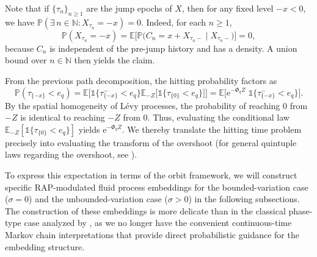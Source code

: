 \documentclass[a4paper,11pt]{article}
\numberwithin{equation}{section}
\theoremstyle{plain}
\theoremstyle{definition}
\newcommand{\1}{\mathbf{1}}
\newcommand{\e}{\mathrm{e}}
\newcommand{\PP}{\mathbb{P}}
\newcommand{\EE}{\mathbb{E}}
\begin{document}
Note that if $\{\tau_n\}_{n \ge 1}$ are the jump epochs of $X$, then for any fixed level $-x < 0$, we have $\mathbb{P}(\exists\, n\in \mathbb{N}: X_{\tau_n} = -x)=0$. Indeed, for each $n\geq 1$,
\[
\PP(X_{\tau_n}=-x)=\EE\Big[\PP\big(C_n=x+X_{\tau_n-}\mid X_{\tau_n-}\big)\Big]=0,
\]
because $C_n$ is independent of the pre-jump history and has a density. A union bound over $n\in\mathbb{N}$ then yields the claim.


From the previous path decomposition, the hitting probability factors as
\begin{equation}\label{eq:hitting_factor}
\PP(\tau_{\{-x\}} < e_q) = \mathbb{E}\Big[\mathds{1}\big\{\tau^-_{\{-x\}} < e_q\big\}\mathbb{E}_{-Z}\big[\mathds{1}\{\tau_{\{0\}} < e_q\}\big]\Big] = \mathbb{E}\Big[\e^{-\Phi_q Z}\;\mathds{1}\big\{\tau^-_{\{-x\}} < e_q\big\}\Big].
\end{equation}
By the spatial homogeneity of Lévy processes, the probability of reaching $0$ from $-Z$ is identical to reaching $-Z$ from $0$. Thus, evaluating the conditional law $\mathbb{E}_{-Z}[\mathds{1}\{\tau_{\{0\}} < e_q\}]$ yields $\e^{-\Phi_q Z}$. We thereby translate the hitting time problem precisely into evaluating the transform of the overshoot (for general quintuple laws regarding the overshoot, see \cite[Theorem 7.7]{Kyprianou2014}).

To express this expectation in terms of the orbit framework, we will construct specific RAP-modulated fluid process embeddings for the bounded-variation case ($\sigma = 0$) and the unbounded-variation case ($\sigma > 0$) in the following subsections. The construction of these embeddings is more delicate than in the classical phase-type case analyzed by \cite{Ivanovs2021}, as we no longer have the convenient continuous-time Markov chain interpretations that provide direct probabilistic guidance for the embedding structure.
\end{document}
